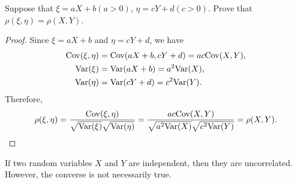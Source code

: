\begin{example}
  Suppose that \(\xi = aX + b (a > 0)\), \(\eta = cY + d (c > 0)\). Prove that \(\rho(\xi, \eta) = \rho(X, Y)\).
\end{example}
\begin{proof}
  Since \(\xi = aX + b\) and \(\eta = cY + d\), we have
  \begin{align*}
    \mathrm{Cov}(\xi, \eta) &= \mathrm{Cov}(aX + b, cY + d) = ac \mathrm{Cov}(X, Y), \\
    \mathrm{Var}(\xi) &= \mathrm{Var}(aX + b) = a^2 \mathrm{Var}(X), \\
    \mathrm{Var}(\eta) &= \mathrm{Var}(cY + d) = c^2 \mathrm{Var}(Y).
  \end{align*}
  Therefore,
  \[
    \rho(\xi, \eta) = \frac{\mathrm{Cov}(\xi, \eta)}{\sqrt{\mathrm{Var}(\xi)} \sqrt{\mathrm{Var}(\eta)}} = \frac{ac \mathrm{Cov}(X, Y)}{\sqrt{a^2 \mathrm{Var}(X)} \sqrt{c^2 \mathrm{Var}(Y)}} = \rho(X, Y). \qedhere
  \]
\end{proof}

\begin{theorem}
  If two random variables \(X\) and \(Y\) are independent, then they are uncorrelated. However, the converse is not necessarily true.
\end{theorem}

